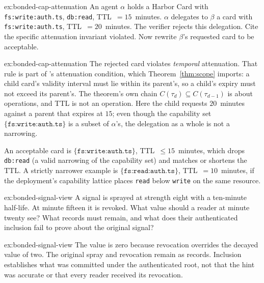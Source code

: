 \documentclass[11pt,a4paper]{article}
\theoremstyle{definition}
\theoremstyle{remark}
\begin{document}
\begin{pdexercise}[kind=Check,rating=1]{ex:bonded-cap-attenuation}
An agent $\alpha$ holds a Harbor Card with \texttt{fs:write:auth.ts}, \texttt{db:read}, TTL~$=15$~minutes. $\alpha$ delegates to $\beta$ a card with \texttt{fs:write:auth.ts}, TTL~$=20$~minutes. The verifier rejects this delegation. Cite the specific attenuation invariant violated. Now rewrite $\beta$'s requested card to be acceptable.
\end{pdexercise}
\begin{pdsolution}{ex:bonded-cap-attenuation}
The rejected card violates \emph{temporal} attenuation. That rule is part of 's attenuation condition, which Theorem~\ref{thm:scope} imports: a child card's validity interval must lie within its parent's, so a child's expiry must not exceed its parent's. The theorem's own chain $C(\tau_{d}) \subseteq C(\tau_{d-1})$ is about operations, and TTL is not an operation. Here the child requests $20$~minutes against a parent that expires at $15$; even though the capability set $\{\texttt{fs:write:auth.ts}\}$ is a subset of $\alpha$'s, the delegation as a whole is not a narrowing.

An acceptable card is $\{\texttt{fs:write:auth.ts}\}$, TTL~$\le 15$~minutes, which drops \texttt{db:read} (a valid narrowing of the capability set) and matches or shortens the TTL. A strictly narrower example is $\{\texttt{fs:read:auth.ts}\}$, TTL~$=10$~minutes, if the deployment's capability lattice places \texttt{read} below \texttt{write} on the same resource.
\end{pdsolution}

\begin{pdexercise}[kind=Check,rating=1]{ex:bonded-signal-view}
A signal is sprayed at strength eight with a ten-minute half-life. At minute
fifteen it is revoked. What value should a reader at minute twenty see?
What records must remain, and what does their authenticated inclusion fail
to prove about the original signal?
\end{pdexercise}
\begin{pdsolution}{ex:bonded-signal-view}
The value is zero because revocation overrides the decayed value of two.
The original spray and revocation remain as records. Inclusion establishes
what was committed under the authenticated root, not that the hint was
accurate or that every reader received its revocation.
\end{pdsolution}
\end{document}
